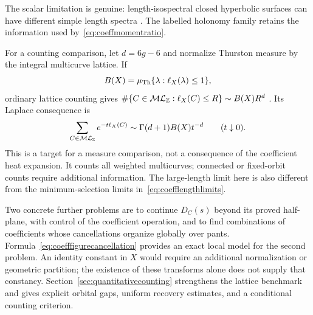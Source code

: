 The scalar limitation is genuine: length-isospectral closed
hyperbolic surfaces can have different simple length spectra
\cite{AougabLahnLovingMiller}. The labelled holonomy family retains
the information used by~\eqref{eq:coeffmomentratio}.

For a counting comparison, let $d=6g-6$ and normalize Thurston
measure by the integral multicurve lattice. If
\[
 B(X)=\mu_{\rm Th}\{\lambda:\ell_X(\lambda)\leq1\},
\]
ordinary lattice counting gives
$\#\{C\in\mathcal{ML}_{\mathbb Z}:\ell_X(C)\leq R\}\sim B(X)R^d$
\cite[Proposition 3.1]{MirzSimple}. Its Laplace consequence is
\[
 \sum_{C\in\mathcal{ML}_{\mathbb Z}}e^{-t\ell_X(C)}
 \sim\Gamma(d+1)B(X)t^{-d}\qquad(t\downarrow0).
\]
This is a target for a measure comparison, not a consequence of
the coefficient heat expansion. It counts all weighted multicurves;
connected or fixed-orbit counts require additional information.
The large-length limit here is also different from the
minimum-selection limits in~\eqref{eq:coefflengthlimits}.

Two concrete further problems are to continue $D_C(s)$ beyond its
proved half-plane, with control of the coefficient operation, and
to find combinations of coefficients whose cancellations organize
globally over pants. Formula~\eqref{eq:coefffigurecancellation}
provides an exact local model for the second problem. An identity
constant in $X$ would require an additional normalization or
geometric partition; the existence of these transforms alone does
not supply that constancy. Section~\ref{sec:quantitativecounting}
strengthens the lattice benchmark and gives explicit orbital gaps,
uniform recovery estimates, and a conditional counting criterion.


\clearpage
